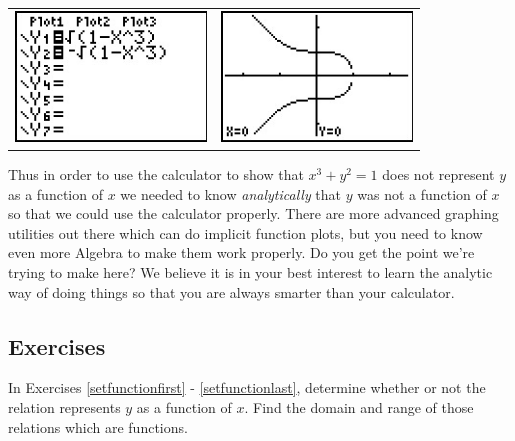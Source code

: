 \begin{ex}
\begin{center}
\begin{tabular}{cc}
\includegraphics[width=2in]{./RelationsandFunctionsGraphics/IntrotoFunctions01.jpg} & \hspace{.75in} \includegraphics[width=2in]{./RelationsandFunctionsGraphics/IntrotoFunctions02.jpg} \\

\end{tabular}

\end{center}

Thus in order to use the calculator to show that $x^3 + y^2 = 1$ does not represent $y$ as a function of $x$ we needed to know \emph{analytically} that $y$ was not a function of $x$ so that we could use the calculator properly. There are more advanced graphing utilities out there which can do implicit function plots, but you need to know even more Algebra to make them work properly.  Do you get the point we're trying to make here?  We believe it is in your best interest to learn the analytic way of doing things so that you are always smarter than your calculator.

\end{ex}

\newpage

\subsection{Exercises}                                     %

In Exercises \ref{setfunctionfirst} - \ref{setfunctionlast}, determine whether or not the relation represents $y$ as a function of $x$.  Find the domain and range of those relations which are functions.

